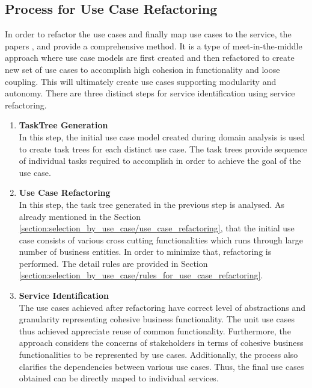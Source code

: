 \subsection{Process for Use Case Refactoring}\label{section:selection_by_use_case/process_for_use_case_refactoring}
In order to refactor the use cases and finally map use cases to the service, the papers \cite{Kim:2006aa}, \cite{Yun:2006aa} and \cite{Doh:2007aa} provide a comprehensive method. It is a type of meet-in-the-middle approach where use case models are first created and then refactored to create new set of use cases to accomplish high cohesion in functionality and loose coupling. This will ultimately create use cases supporting modularity and autonomy. \cite{Fareghzadeh:2008aa} There are three distinct steps for service identification using service refactoring.
\begin{enumerate}
\item \textbf{TaskTree Generation}\\
In this step, the initial use case model created during domain analysis is used to create task trees for each distinct use case. The task trees provide sequence of individual tasks required to accomplish in order to achieve the goal of the use case.
\\
\item \textbf{Use Case Refactoring}\\
In this step, the task tree generated in the previous step is analysed. As already mentioned in the Section \ref{section:selection_by_use_case/use_case_refactoring}, that the initial use case consists of various cross cutting functionalities which runs through large number of business entities. In order to minimize that, refactoring is performed. The detail rules are provided in Section \ref{section:selection_by_use_case/rules_for_use_case_refactoring}.
\\
\item \textbf{Service Identification}\\
The use cases achieved after refactoring have correct level of abstractions and granularity representing cohesive business functionality. The unit use cases thus achieved appreciate reuse of common functionality.  \cite{Doh:2007aa} Furthermore, the approach considers the concerns of stakeholders in terms of cohesive business functionalities to be represented by use cases.\cite{Fareghzadeh:2008aa} Additionally, the process also clarifies the dependencies between various use cases. Thus, the final use cases obtained can be directly maped to individual services.
\end{enumerate}
\\

